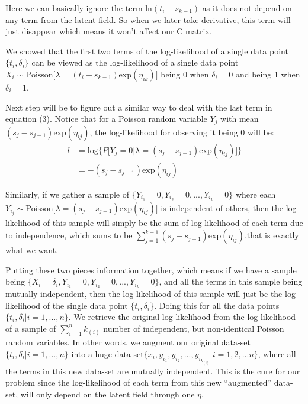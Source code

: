 \documentclass[]{article}
\begin{document}
Here we can basically ignore the term \(\text{ln}(t_i-s_{k-1})\) as it
does not depend on any term from the latent field. So when we later take
derivative, this term will just disappear which means it won't affect
our C matrix.

We showed that the first two terms of the log-likelihood of a single
data point \(\{t_i,\delta_i\}\) can be viewed as the log-likelihood of a
single data point
\(X_i\sim \text{Poisson}\big[\lambda =(t_i-s_{k-1})\text{exp}(\eta_{ik})\big]\)
being \(0\) when \(\delta_i = 0\) and being 1 when \(\delta_i = 1\).

Next step will be to figure out a similar way to deal with the last term
in equation (3). Notice that for a Poisson random variable \(Y_j\) with
mean \((s_{j}-s_{j-1})\text{exp}(\eta_{ij})\), the log-likelihood for
observing it being \(0\) will be:
\begin{equation}\begin{aligned}\label{eqn:loglike3}
l &= \text{log}\bigg \{P\big [Y_j =0|\lambda = (s_{j}-s_{j-1})\text{exp}(\eta_{ij})\big ]\bigg \}\\
  &= -(s_{j}-s_{j-1})\text{exp}(\eta_{ij})
\end{aligned}\end{equation}

Similarly, if we gather a sample of
\(\{Y_{i_{1}}=0,Y_{i_{2}} =0, ..., Y_{i_{k}}=0 \}\) where each
\(Y_{i_j} \sim \text{Poisson}\big[\lambda = (s_{j}-s_{j-1})\text{exp}(\eta_{ij})\big]\)
is independent of others, then the log-likelihood of this sample will
simply be the sum of log-likelihood of each term due to independence,
which sums to be
\(\sum_{j=1}^{k-1} (s_{j}-s_{j-1})\text{exp}(\eta_{ij})\),that is
exactly what we want.

Putting these two pieces information together, which means if we have a
sample being
\(\{X_i =\delta_i,Y_{i_{1}}=0,Y_{i_{2}} =0, ..., Y_{i_{k}}=0 \}\), and
all the terms in this sample being mutually independent, then the
log-likelihood of this sample will just be the log-likelihood of the
single data point \(\{t_i,\delta_i\}\). Doing this for all the data
points \(\{t_i,\delta_i|i=1,...,n\}\). We retrieve the original
log-likelihood from the log-likelihood of a sample of
\(\sum_{i=1}^{n}{k_{(i)}}\) number of independent, but non-identical
Poisson random variables. In other words, we augment our original
data-set \(\{t_i,\delta_i|i=1,...,n\}\) into a huge
data-set\(\{x_i ,y_{i_{1}},y_{i_{2}}, ..., y_{i_{k_{(i)}}}|i=1,2,...n\}\),
where all the terms in this new data-set are mutually independent. This
is the cure for our problem since the log-likelihood of each term from
this new ``augmented'' data-set, will only depend on the latent field
through one \(\eta\).
\end{document}
